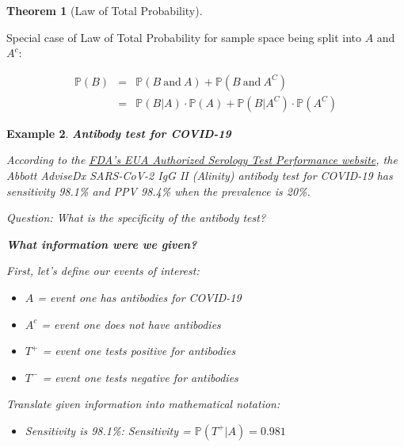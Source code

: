 \documentclass[12pt]{amsart}
\newtheorem{theorem}{Theorem}[section]
\newtheorem{example}[theorem]{Example}
\begin{document}
{\begin{theorem}[Law of Total Probability]
\vspace{0.5cm}

\end{theorem}


Special case of Law of Total Probability for sample space being split into $A$ and $A^c$: 

\[
\begin{array}{ccl}
\mathbb{P}(B)&=&\mathbb{P}(B\ \textrm{and}\ A) + \mathbb{P}(B\ \textrm{and}\ A^C)\\
		   &=& \mathbb{P}(B|A) \cdot \mathbb{P}(A)+ \mathbb{P}(B | A^C)\cdot \mathbb{P}(A^C)
\end{array}
\]


\newpage


\begin{example} \textbf{Antibody test for COVID-19} 

According to the \href{https://www.fda.gov/medical-devices/coronavirus-disease-2019-covid-19-emergency-use-authorizations-medical-devices/eua-authorized-serology-test-performance}{FDA's EUA Authorized Serology Test Performance website}, %
the Abbott AdviseDx SARS-CoV-2 IgG II (Alinity) antibody test for COVID-19 has sensitivity 98.1\% and PPV 98.4\% when the prevalence is 20\%. \newline

Question: What is the specificity of the antibody test?

\vspace{0.5cm}
\textbf{What information were we given?}%

First, let's define our events of interest: 
\begin{itemize}
	\item $A$ = event one has antibodies for COVID-19
	\item $A^c$ = event one does not have antibodies
	\item $T^+$ = event one tests positive for antibodies
	\item $T^-$ = event one tests negative for antibodies
\end{itemize}
\vspace{0.5cm}
Translate given information into mathematical notation:
\begin{itemize}
	\item Sensitivity is 98.1\%:\newline
	Sensitivity  = $\mathbb{P}(T^+|A) = 0.981$


\end{itemize}
\end{example}}
\end{document}
